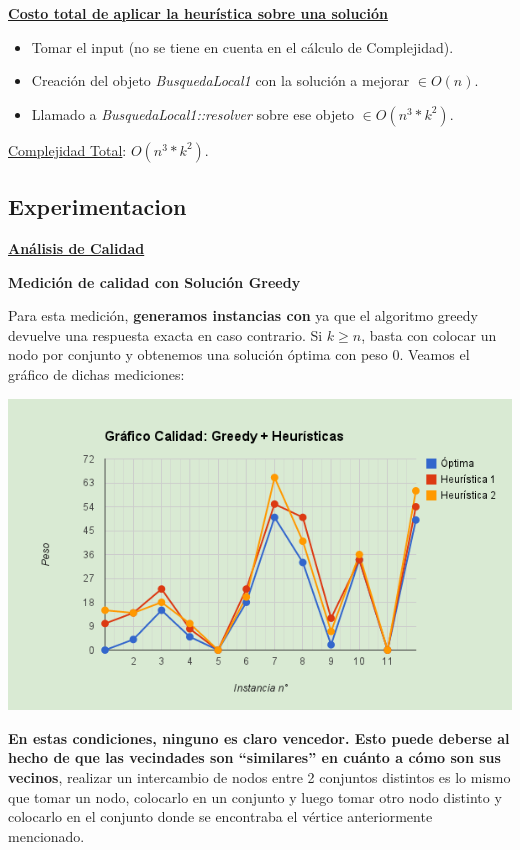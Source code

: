 \documentclass[10pt,a4paper]{article}
\begin{document}
\textbf{\underline{Costo total de aplicar la heurística sobre una solución}}

\begin{itemize}
\item Tomar el input (no se tiene en cuenta en el cálculo de Complejidad).
\item Creación del objeto \textit{BusquedaLocal1} con la solución a mejorar $\in O(n)$.
\item Llamado a \textit{BusquedaLocal1::resolver} sobre ese objeto $\in O(n^3*k^2)$.
\end{itemize}

\underline{Complejidad Total}: $O(n^3*k^2)$.

\newpage
\subsection{Experimentacion}

\noindent \textbf{\underline{Análisis de Calidad}}

\noindent \textbf{Medición de calidad con Solución Greedy}

Para esta medición, \textbf{generamos instancias con } ya que el algoritmo greedy devuelve una respuesta exacta en caso contrario. Si $k \geq n$, basta con colocar un nodo por conjunto y obtenemos una solución óptima con peso $0$. Veamos el gráfico de dichas mediciones:

\includegraphics[scale=0.45]{grafico_calicad_greedy_heuristicas.png}

\textbf{En estas condiciones, ninguno es claro vencedor. Esto puede deberse al hecho de que las vecindades son ``similares'' en cuánto a cómo son sus vecinos}, realizar un intercambio de nodos entre 2 conjuntos distintos es lo mismo que tomar un nodo, colocarlo en un conjunto y luego tomar otro nodo distinto y colocarlo en el conjunto donde se encontraba el vértice anteriormente mencionado. 
\end{document}
